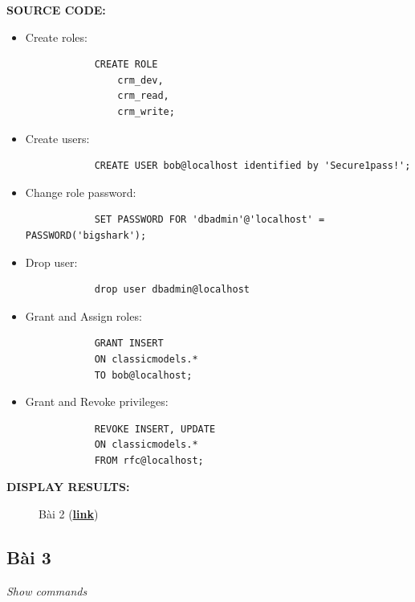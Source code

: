 \documentclass[12pt,a4paper]{report}
\begin{document}
	{\bf SOURCE CODE:}
	\begin{itemize}
		\item Create roles:
		\begin{lstlisting}
			CREATE ROLE 
    			crm_dev, 
    			crm_read, 
    			crm_write;
		\end{lstlisting}
		\item Create users:
		\begin{lstlisting}
			CREATE USER bob@localhost identified by 'Secure1pass!';
		\end{lstlisting}
		\item Change role password:
		\begin{lstlisting}
			SET PASSWORD FOR 'dbadmin'@'localhost' = PASSWORD('bigshark');
		\end{lstlisting}
		\item Drop user:
		\begin{lstlisting}
			drop user dbadmin@localhost
		\end{lstlisting}
		\item Grant and Assign roles:
		\begin{lstlisting}
			GRANT INSERT 
			ON classicmodels.* 
			TO bob@localhost;
		\end{lstlisting}
		\item Grant and Revoke privileges:
		\begin{lstlisting}
			REVOKE INSERT, UPDATE
			ON classicmodels.*
			FROM rfc@localhost;
		\end{lstlisting}
	\end{itemize}

	{\bf DISPLAY RESULTS:}
		\begin{figure}[!h]
		\hfill
		\hfill
 		\hfill
		\hfill
		\hfill
 		\hfill
		\caption{Bài 2 (\href{https://drive.google.com/drive/folders/1NnueamqosCX5AvXE-wK86MoIEI4dA5RE}{\bf link})}
		\end{figure}


\subsection{Bài 3}
	\begin{center}
		{\it Show commands}
	\end{center}
	
\end{document}
